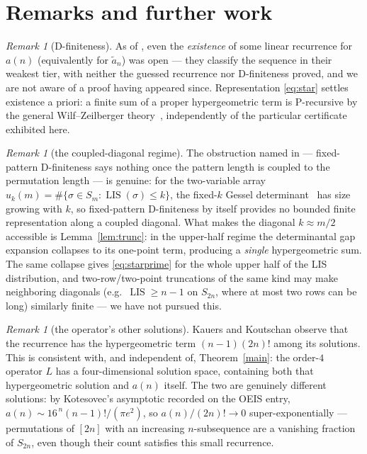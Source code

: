 \documentclass[11pt]{article}
\theoremstyle{plain}
\theoremstyle{definition}
\theoremstyle{remark}
\newtheorem{remark}[theorem]{Remark}
\newcommand{\LIS}{\operatorname{LIS}}
\newcommand{\Lop}{L}
\begin{document}
\section{Remarks and further work}

\begin{remark}[D-finiteness]
As of \cite{KK23}, even the \emph{existence} of some linear recurrence for $a(n)$ (equivalently
for $\tilde a_n$) was open --- they classify the sequence in their weakest tier, with neither
the guessed recurrence nor D-finiteness proved, and we are not aware of a proof having appeared
since. Representation \eqref{eq:star} settles existence a priori: a finite sum of a proper
hypergeometric term is P-recursive by the general Wilf--Zeilberger theory~\cite{WZ92},
independently of the particular certificate exhibited here.
\end{remark}

\begin{remark}[the coupled-diagonal regime]
The obstruction named in \cite{KK23} --- fixed-pattern D-finiteness says nothing once the pattern
length is coupled to the permutation length --- is genuine: for the two-variable array
$u_k(m)=\#\{\sigma\in S_m:\LIS(\sigma)\le k\}$, the fixed-$k$ Gessel determinant~\cite{Ges90}
has size growing with $k$, so fixed-pattern D-finiteness by itself provides no bounded finite
representation along a coupled diagonal. What makes the diagonal $k\approx m/2$ accessible is
Lemma~\ref{lem:trunc}: in the upper-half regime the determinantal gap expansion collapses to its
one-point term, producing a \emph{single} hypergeometric sum. The same collapse gives
\eqref{eq:starprime} for the whole upper half of the LIS distribution, and two-row/two-point
truncations of the same kind may make neighboring diagonals (e.g.\ $\LIS\ge n-1$ on $S_{2n}$,
where at most two rows can be long) similarly finite --- we have not pursued this.
\end{remark}

\begin{remark}[the operator's other solutions]
Kauers and Koutschan observe that the recurrence has the hypergeometric term $(n-1)(2n)!$ among
its solutions. This is consistent with, and independent of, Theorem~\ref{main}: the order-$4$
operator $\Lop$ has a four-dimensional solution space, containing both that hypergeometric
solution and $a(n)$ itself. The two are genuinely different solutions: by Kotesovec's asymptotic
recorded on the OEIS entry, $a(n)\sim 16^{\,n}(n-1)!/(\pi e^{2})$, so $a(n)/(2n)!\to0$
super-exponentially --- permutations of $[2n]$ with an increasing $n$-subsequence are a vanishing
fraction of $S_{2n}$, even though their count satisfies this small recurrence.
\end{remark}
\end{document}
